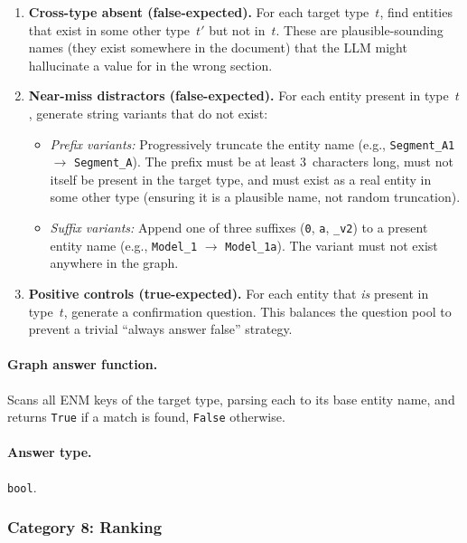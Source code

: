 \documentclass[11pt]{article}
\begin{document}
\begin{enumerate}[leftmargin=2em, label=(\alph*)]
  \item \textbf{Cross-type absent (false-expected).}  For each target
    type~$t$, find entities that exist in some other type~$t'$ but not
    in~$t$.  These are plausible-sounding names (they exist somewhere in
    the document) that the LLM might hallucinate a value for in the
    wrong section.

  \item \textbf{Near-miss distractors (false-expected).}  For each
    entity present in type~$t$, generate string variants that do not
    exist:
    \begin{itemize}[leftmargin=1.5em]
      \item \emph{Prefix variants:}  Progressively truncate the entity
        name (e.g., \texttt{Segment\_A1} $\to$ \texttt{Segment\_A}).
        The prefix must be at least 3~characters long, must not itself
        be present in the target type, and must exist as a real entity
        in some other type (ensuring it is a plausible name, not random
        truncation).
      \item \emph{Suffix variants:}  Append one of three suffixes
        (\texttt{0}, \texttt{a}, \texttt{\_v2}) to a present entity
        name (e.g., \texttt{Model\_1} $\to$ \texttt{Model\_1a}).  The
        variant must not exist anywhere in the graph.
    \end{itemize}

  \item \textbf{Positive controls (true-expected).}  For each entity
    that \emph{is} present in type~$t$, generate a confirmation question.
    This balances the question pool to prevent a trivial ``always answer
    false'' strategy.
\end{enumerate}

\paragraph{Graph answer function.}
Scans all ENM keys of the target type, parsing each to its base entity
name, and returns \texttt{True} if a match is found, \texttt{False}
otherwise.

\paragraph{Answer type.} \texttt{bool}.

\subsubsection{Category 8: Ranking}
\end{document}
